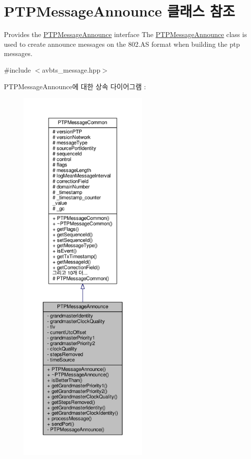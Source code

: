 \hypertarget{class_p_t_p_message_announce}{}\section{P\+T\+P\+Message\+Announce 클래스 참조}
\label{class_p_t_p_message_announce}


Provides the \hyperlink{class_p_t_p_message_announce}{P\+T\+P\+Message\+Announce} interface The \hyperlink{class_p_t_p_message_announce}{P\+T\+P\+Message\+Announce} class is used to create announce messages on the 802.\+AS format when building the ptp messages.  




{\ttfamily \#include $<$avbts\+\_\+message.\+hpp$>$}



P\+T\+P\+Message\+Announce에 대한 상속 다이어그램 \+: 
\nopagebreak
\begin{figure}[H]
\begin{center}
\leavevmode
\includegraphics[height=550pt]{class_p_t_p_message_announce__inherit__graph}
\end{center}
\end{figure}


